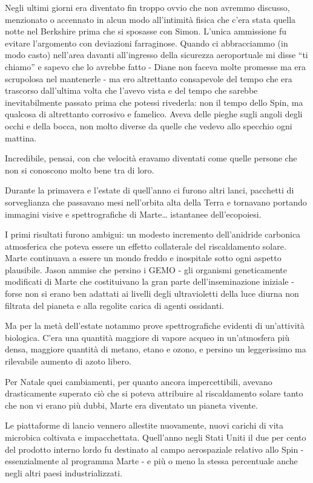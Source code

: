 Negli ultimi giorni era diventato fin troppo ovvio che non avremmo
discusso, menzionato o accennato in alcun modo all'intimità fisica che
c'era stata quella notte nel Berkshire prima che si sposasse con Simon.
L'unica ammissione fu evitare l'argomento con deviazioni farraginose.
Quando ci abbracciammo (in modo casto) nell'area davanti all'ingresso
della sicurezza aeroportuale mi disse ``ti chiamo'' e sapevo che lo
avrebbe fatto - Diane non faceva molte promesse ma era scrupolosa nel
mantenerle - ma ero altrettanto consapevole del tempo che era trascorso
dall'ultima volta che l'avevo vista e del tempo che sarebbe
inevitabilmente passato prima che potessi rivederla: non il tempo dello
Spin, ma qualcosa di altrettanto corrosivo e famelico. Aveva delle
pieghe sugli angoli degli occhi e della bocca, non molto diverse da
quelle che vedevo allo specchio ogni mattina.

Incredibile, pensai, con che velocità eravamo diventati come quelle
persone che non si conoscono molto bene tra di loro.

\separatorefiori

Durante la primavera e l'estate di quell'anno ci furono altri lanci,
pacchetti di sorveglianza che passavano mesi nell'orbita alta della
Terra e tornavano portando immagini visive e spettrografiche di
Marte\ldots{} istantanee dell'ecopoiesi.

I primi risultati furono ambigui: un modesto incremento dell'anidride
carbonica atmosferica che poteva essere un effetto collaterale del
riscaldamento solare. Marte continuava a essere un mondo freddo e
inospitale sotto ogni aspetto plausibile. Jason ammise che persino i
GEMO - gli organismi geneticamente modificati di Marte che costituivano
la gran parte dell'inseminazione iniziale - forse non si erano ben
adattati ai livelli degli ultravioletti della luce diurna non filtrata
del pianeta e alla regolite carica di agenti ossidanti.

Ma per la metà dell'estate notammo prove spettrografiche evidenti di
un'attività biologica. C'era una quantità maggiore di vapore acqueo in
un'atmosfera più densa, maggiore quantità di metano, etano e ozono, e
persino un leggerissimo ma rilevabile aumento di azoto libero.

Per Natale quei cambiamenti, per quanto ancora impercettibili, avevano
drasticamente superato ciò che si poteva attribuire al riscaldamento
solare tanto che non vi erano più dubbi, Marte era diventato un pianeta
vivente.

Le piattaforme di lancio vennero allestite nuovamente, nuovi carichi di
vita microbica coltivata e impacchettata. Quell'anno negli Stati Uniti
il due per cento del prodotto interno lordo fu destinato al campo
aerospaziale relativo allo Spin - essenzialmente al programma Marte - e
più o meno la stessa percentuale anche negli altri paesi
industrializzati.

